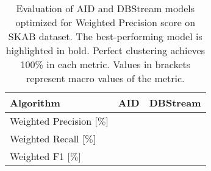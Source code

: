 \documentclass{article}
\begin{document}
\begin{enumerate}
        \begin{table}[htbp]
            \caption{Evaluation of AID and DBStream models optimized for Weighted Precision score on SKAB dataset. The best-performing model is highlighted in bold. Perfect clustering achieves 100\% in each metric. Values in brackets represent macro values of the metric.}
            \begin{center}
                \label{tab:perf_comp_multiclass}
                \begin{tabular}{|l|c|c|}
                    \hline
                    \textbf{Algorithm}        & AID               & DBStream \\
                    \hline
                    Weighted Precision [$\%$] & $\boldsymbol{}$ &        \\
                    \hline
                    Weighted Recall [$\%$]    & $\boldsymbol{}$ &         \\
                    \hline
                    Weighted F1 [$\%$]        & $\boldsymbol{}$ &         \\
                    \hline
                \end{tabular}
            \end{center}
        \end{table}

\end{enumerate}


\end{document}
